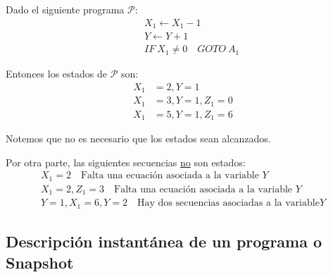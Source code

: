 Dado el siguiente programa $\mathcal{P}$:
\begin{align*}
    [A_1] \quad &X_1 \gets X_1 - 1 \\
                &Y \gets Y + 1 \\
                &IF ~ X_1 \neq 0 \quad GOTO ~ A_1
\end{align*}

Entonces los estados de $\mathcal{P}$ son:
\begin{align*}
    X_1 &= 2, Y = 1 \\
    X_1 &= 3, Y = 1, Z_1 = 0 \\
    X_1 &= 5, Y = 1, Z_1 = 6
\end{align*}

Notemos que no es necesario que los estados sean alcanzados.

\medskip

Por otra parte, las siguientes secuencias \underline{no} son estados:
\begin{align*}
    X_1 = 2 \quad \text{Falta una ecuación asociada a la variable } Y \\
    X_1 = 2, Z_1 = 3 \quad \text{Falta una ecuación asociada a la 
    variable } Y \\
    Y = 1, X_1 = 6, Y = 2 \quad \text{Hay dos secuencias asociadas a la 
    variable} Y
\end{align*}

\subsection{Descripción instantánea de un programa o Snapshot}

